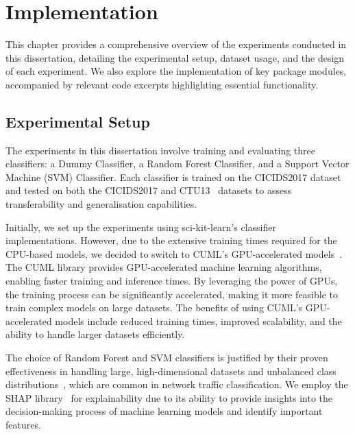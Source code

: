 \chapter{Implementation}\label{chap:implementation}

This chapter provides a comprehensive overview of the experiments conducted in this dissertation, detailing the experimental setup, dataset usage, and the design of each experiment. We also explore the implementation of key package modules, accompanied by relevant code excerpts highlighting essential functionality.

\section{Experimental Setup}\label{sec:experimental-setup}
The experiments in this dissertation involve training and evaluating three classifiers: a Dummy Classifier, a Random Forest Classifier, and a Support Vector Machine (SVM) Classifier. Each classifier is trained on the CICIDS2017 dataset~\cite{sharafaldin2018toward} and tested on both the CICIDS2017 and CTU13~\cite{garcia2014empirical} datasets to assess transferability and generalisation capabilities.

Initially, we set up the experiments using sci-kit-learn's classifier implementations. However, due to the extensive training times required for the CPU-based models, we decided to switch to CUML's GPU-accelerated models~\cite{raschka2020machine}. The CUML library provides GPU-accelerated machine learning algorithms, enabling faster training and inference times. By leveraging the power of GPUs, the training process can be significantly accelerated, making it more feasible to train complex models on large datasets. The benefits of using CUML's GPU-accelerated models include reduced training times, improved scalability, and the ability to handle larger datasets efficiently.

The choice of Random Forest and SVM classifiers is justified by their proven effectiveness in handling large, high-dimensional datasets and unbalanced class distributions~\cite{farnaaz2016random, teng2017svm}, which are common in network traffic classification. We employ the SHAP library~\cite{lundberg2017unified} for explainability due to its ability to provide insights into the decision-making process of machine learning models and identify important features.

